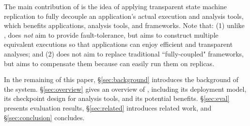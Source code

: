 



The main contribution of \xxx is the idea of applying transparent state 
machine replication to fully decouple 
an application's actual execution and analysis tools, which benefits 
applications, analysis tools, and frameworks. Note that: (1) unlike 
\repbox, \xxx does \emph{not} aim to provide fault-tolerance, but aims to 
construct multiple equivalent executions so that applications can enjoy 
efficient and transparent analyses; and (2) \xxx does not aim to replace 
traditional ``fully-coupled" frameworks, but aims to compensate them because \xxx 
can easily run them on replicas.


In the remaining of this paper, \S\ref{sec:background} introduces the 
background of the \repbox system. \S\ref{sec:overview} gives an overview of 
\xxx, including its deployment model, its checkpoint design for analysis 
tools, and its potential benefits. \S\ref{sec:eval} presents evaluation 
results, \S\ref{sec:related} introduces related work, and 
\S\ref{sec:conclusion} concludes.